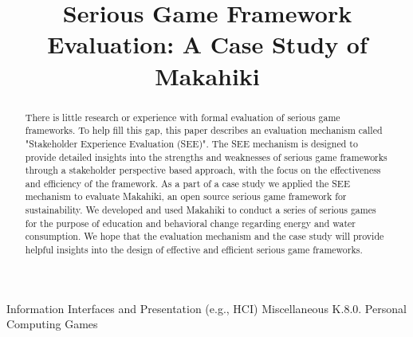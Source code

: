 \documentclass{sigchi}
\begin{document}
\title{Serious Game Framework Evaluation: A Case Study of Makahiki}


\maketitle

\begin{abstract}
There is little research or experience with formal evaluation of
serious game frameworks. To help fill this gap, this paper describes
an evaluation mechanism called "Stakeholder Experience Evaluation
(SEE)". The SEE mechanism is designed to provide detailed insights
into the strengths and weaknesses of serious game frameworks through a
stakeholder perspective based approach, with the focus on the
effectiveness and efficiency of the framework. As a part of a case
study we applied the SEE mechanism to evaluate Makahiki, an open
source serious game framework for sustainability.  We developed and
used Makahiki to conduct a series of serious games for the purpose of
education and behavioral change regarding energy and water
consumption. We hope that the evaluation mechanism and the case study
will provide helpful insights into the design of effective and
efficient serious game frameworks.

\end{abstract}


 {Information Interfaces and Presentation (e.g., HCI)} {Miscellaneous}
 {K.8.0.} {Personal Computing} {Games}

\end{document}
